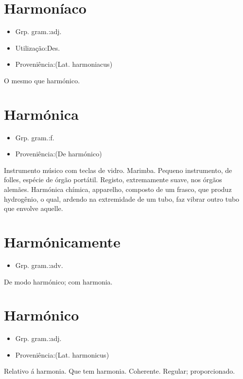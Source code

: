 \documentclass{article}
\begin{document}
\section{Harmoníaco}
\begin{itemize}
\item {Grp. gram.:adj.}
\end{itemize}
\begin{itemize}
\item {Utilização:Des.}
\end{itemize}
\begin{itemize}
\item {Proveniência:(Lat. \textunderscore harmoniacus\textunderscore )}
\end{itemize}
O mesmo que \textunderscore harmónico\textunderscore .
\section{Harmónica}
\begin{itemize}
\item {Grp. gram.:f.}
\end{itemize}
\begin{itemize}
\item {Proveniência:(De \textunderscore harmónico\textunderscore )}
\end{itemize}
Instrumento músico com teclas de vidro.
Marimba.
Pequeno instrumento, de folles, espécie de órgão portátil.
Registo, extremamente suave, nos órgãos alemães.
\textunderscore Harmónica chímica\textunderscore , apparelho, composto de um frasco, que produz hydrogênio, o qual, ardendo na extremidade de um tubo, faz vibrar outro tubo que envolve aquelle.
\section{Harmónicamente}
\begin{itemize}
\item {Grp. gram.:adv.}
\end{itemize}
De modo harmónico; com harmonia.
\section{Harmónico}
\begin{itemize}
\item {Grp. gram.:adj.}
\end{itemize}
\begin{itemize}
\item {Proveniência:(Lat. \textunderscore harmonicus\textunderscore )}
\end{itemize}
Relativo á harmonia.
Que tem harmonia.
Coherente.
Regular; proporcionado.
\end{document}
